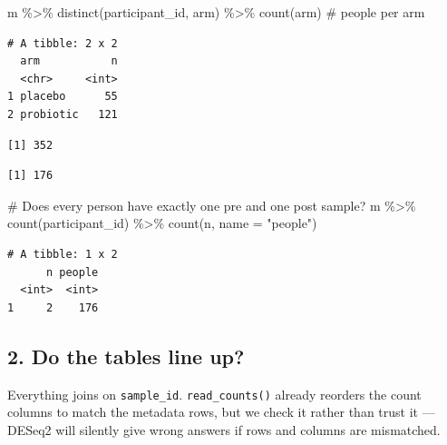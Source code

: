 \documentclass[
  letterpaper,
  DIV=11,
  numbers=noendperiod]{scrartcl}
\newenvironment{Shaded}{\begin{snugshade}}{\end{snugshade}}
\newcommand{\AttributeTok}[1]{\textcolor[rgb]{0.40,0.45,0.13}{#1}}
\newcommand{\CommentTok}[1]{\textcolor[rgb]{0.37,0.37,0.37}{#1}}
\newcommand{\FunctionTok}[1]{\textcolor[rgb]{0.28,0.35,0.67}{#1}}
\newcommand{\NormalTok}[1]{\textcolor[rgb]{0.00,0.23,0.31}{#1}}
\newcommand{\SpecialCharTok}[1]{\textcolor[rgb]{0.37,0.37,0.37}{#1}}
\newcommand{\StringTok}[1]{\textcolor[rgb]{0.13,0.47,0.30}{#1}}
\begin{document}
\begin{Shaded}
\begin{Highlighting}[]
\NormalTok{m }\SpecialCharTok{\%\textgreater{}\%} \FunctionTok{distinct}\NormalTok{(participant\_id, arm) }\SpecialCharTok{\%\textgreater{}\%} \FunctionTok{count}\NormalTok{(arm)   }\CommentTok{\# people per arm}
\end{Highlighting}
\end{Shaded}

\begin{verbatim}
# A tibble: 2 x 2
  arm           n
  <chr>     <int>
1 placebo      55
2 probiotic   121
\end{verbatim}

\begin{Shaded}
\end{Shaded}

\begin{verbatim}
[1] 352
\end{verbatim}

\begin{verbatim}
[1] 176
\end{verbatim}

\begin{Shaded}
\begin{Highlighting}[]
\CommentTok{\# Does every person have exactly one pre and one post sample?}
\NormalTok{m }\SpecialCharTok{\%\textgreater{}\%} \FunctionTok{count}\NormalTok{(participant\_id) }\SpecialCharTok{\%\textgreater{}\%} \FunctionTok{count}\NormalTok{(n, }\AttributeTok{name =} \StringTok{"people"}\NormalTok{)}
\end{Highlighting}
\end{Shaded}

\begin{verbatim}
# A tibble: 1 x 2
      n people
  <int>  <int>
1     2    176
\end{verbatim}

\subsection{2. Do the tables line up?}\label{do-the-tables-line-up}

Everything joins on \texttt{sample\_id}. \texttt{read\_counts()} already
reorders the count columns to match the metadata rows, but we check it
rather than trust it --- DESeq2 will silently give wrong answers if rows
and columns are mismatched.
\end{document}
